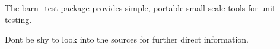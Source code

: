 The barn\+\_\+test package provides simple, portable small-\/scale tools for unit testing.

Dont be shy to look into the sources for further direct information. 